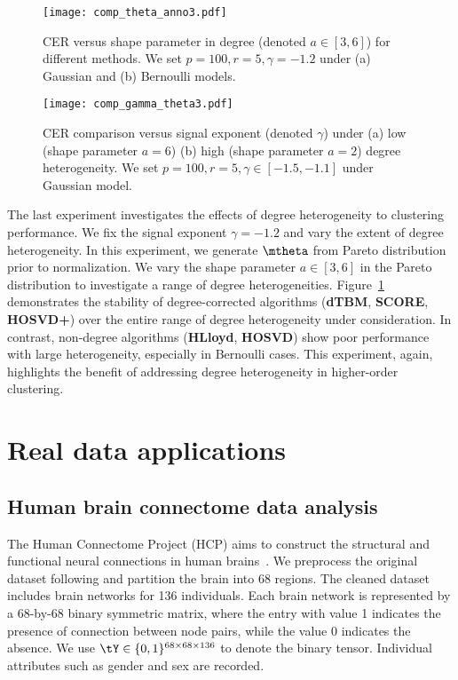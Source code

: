\documentclass[lettersize,onecolumn,journal]{IEEEtran}
\theoremstyle{definition}
\theoremstyle{definition}
\begin{document}
\begin{figure}[h!]
    \centering
    \texttt{[image: comp\_theta\_anno3.pdf]}
    \caption{CER versus shape parameter in degree (denoted $a\in[3,6]$) for different methods. We set $p = 100, r = 5, \gamma = -1.2$ under (a) Gaussian and (b) Bernoulli models.}
    \label{fig:comp_theta}
\end{figure}



\begin{figure}[htp!]
    \centering
    \texttt{[image: comp\_gamma\_theta3.pdf]}
    \caption{CER comparison versus signal exponent (denoted $\gamma$) under (a) low (shape parameter $a = 6$)  (b) high (shape parameter $a = 2$) degree heterogeneity. We set $p = 100, r = 5, \gamma \in [-1.5, -1.1]$ under Gaussian model.}
    \label{fig:comp_gamma_theta}
\end{figure}

The last experiment investigates the effects of degree heterogeneity to clustering performance. We fix the signal exponent $\gamma = -1.2$ and vary the extent of degree heterogeneity. In this experiment, we generate $\mtheta$ from Pareto distribution prior to normalization. We vary the shape parameter $a \in [3,6]$ in the Pareto distribution to investigate a range of degree heterogeneities. Figure~\ref{fig:comp_theta} demonstrates the stability of degree-corrected algorithms (\textbf{\small dTBM}, \textbf{\small SCORE}, \textbf{\small HOSVD+}) over the entire range of degree heterogeneity under consideration. In contrast, non-degree algorithms (\textbf{\small HLloyd}, \textbf{\small HOSVD}) show poor performance with large heterogeneity, especially in Bernoulli cases. This experiment, again, highlights the benefit of addressing degree heterogeneity in higher-order clustering. 




\section{Real data applications}\label{sec:real}
\subsection{Human brain connectome data analysis}

The Human Connectome Project (HCP) aims to construct the structural and functional neural connections in human brains~\citep{van2013wu}. We preprocess the original dataset following \cite{desikan2006automated} and partition the brain into 68 regions. The cleaned dataset includes brain networks for 136 individuals. Each brain network is represented by a 68-by-68 binary symmetric matrix, where the entry with value 1 indicates the presence of connection between node pairs, while the value 0 indicates the absence. We use $\tY \in \{0,1\}^{68 \times 68 \times 136}$ to denote the binary tensor. Individual attributes such as gender and sex are recorded.
\end{document}
